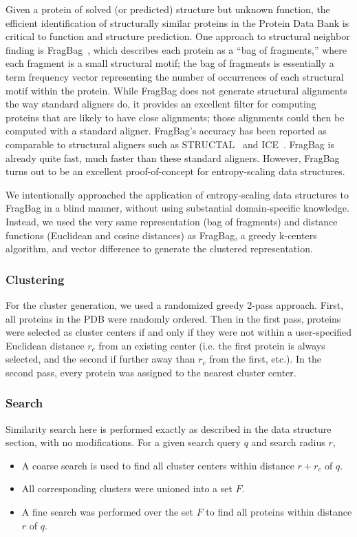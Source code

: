\documentclass[review,preprint,12pt]{elsarticle}
\theoremstyle{definition}
\theoremstyle{remark}
\numberwithin{equation}{section}
\begin{document}
Given a protein of solved (or predicted) structure but unknown function, the efficient identification
of structurally similar proteins in the Protein Data Bank is critical to function and structure prediction.
One approach to structural neighbor finding is FragBag~\cite{budowski2010fragbag}, which describes each protein as a
``bag of fragments,'' where each fragment is a small structural motif; the bag of fragments is essentially
a term frequency vector representing the number of occurrences of each structural motif within the protein.
While FragBag does not generate structural alignments the way standard aligners do, it provides an excellent
filter for computing proteins that are likely to have close alignments; those alignments could then be computed
with a standard aligner.
FragBag's accuracy has been reported as comparable to structural aligners such as STRUCTAL~\cite{blah} and
ICE~\cite{blah}.
FragBag is already quite fast, much faster than these standard aligners.
However, FragBag turns out to be an excellent proof-of-concept for entropy-scaling data structures.

We intentionally approached the application of entropy-scaling data structures to FragBag in a blind manner,
without using substantial domain-specific knowledge.
Instead, we used the very same representation (bag of fragments) and distance functions (Euclidean and cosine distances)
as FragBag, a greedy k-centers algorithm, and vector difference to generate the clustered representation.

\subsubsection*{Clustering}
For the cluster generation, we used a randomized greedy 2-pass approach.
First, all proteins in the PDB were randomly ordered.
Then in the first pass, proteins were selected as cluster centers if and only if they were not within a user-specified Euclidean distance $r_c$ from an existing center (i.e. the first protein is always selected, and the second if further away than $r_c$ from the first, etc.).
In the second pass, every protein was assigned to the nearest cluster center.

\subsubsection*{Search}
Similarity search here is performed exactly as described in the data structure section, with no modifications.
For a given search query $q$ and search radius $r$,
\begin{itemize}
    \item A coarse search is used to find all cluster centers within distance $r+r_c$ of $q$.
    \item All corresponding clusters were unioned into a set $F$.
    \item A fine search was performed over the set $F$ to find all proteins within distance $r$ of $q$.
\end{itemize}
\end{document}
